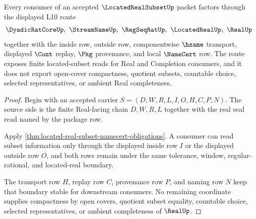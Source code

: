 \begin{theorem}
\label{thm:located-real-subset-l10-scope}
Every consumer of an accepted $\LocatedRealSubsetUp$ packet factors through the displayed L10 route
$$
\DyadicRatCoreUp,\ \StreamNameUp,\ \RegSeqRatUp,\ \LocatedRealUp,\ \RealUp
$$
together with the inside row, outside row, componentwise $\hsame$ transport, displayed $\Cont$ replay, $\Pkg$ provenance, and local $\NameCert$ row. The route exposes finite located-subset reads for Real and Completion consumers, and it does not export open-cover compactness, quotient subsets, countable choice, selected representatives, or ambient Real completeness.
\end{theorem}
\begin{proof}
Begin with an accepted carrier $S=(D,W,R,L,I,O,H,C,P,N)$. The source side is the finite Real-facing chain $D,W,R,L$ together with the real seal read named by the package row.

Apply \autoref{thm:located-real-subset-namecert-obligations}. A consumer can read subset information only through the displayed inside row $I$ or the displayed outside row $O$, and both rows remain under the same tolerance, window, regular-rational, and located-real boundary.

The transport row $H$, replay row $C$, provenance row $P$, and naming row $N$ keep that boundary stable for downstream consumers. No remaining coordinate supplies compactness by open covers, quotient subset equality, countable choice, selected representatives, or ambient completeness of $\RealUp$.
\end{proof}


\begin{closurestatus}{\LocatedRealSubsetUp}
  \theoryclosure{\seedClosure}
  \formalstatus{\unformalizedV}
\end{closurestatus}
